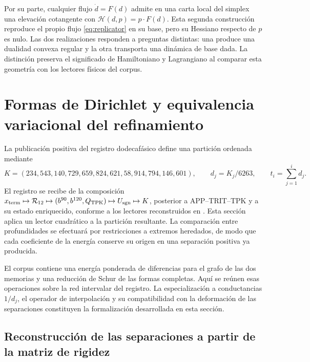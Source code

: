 \documentclass[a4paper,10pt]{article}
\theoremstyle{definition}\newtheorem{definition}[theorem]{Definición}
\theoremstyle{remark}\newtheorem{remark}[theorem]{Observación}
\numberwithin{equation}{section}
\begin{document}
Por su parte, cualquier flujo \(\dot d=F(d)\) admite en una carta local
del simplex una elevación cotangente con
\(\mathscr H(d,p)=p\cdot F(d)\). Esta segunda construcción reproduce
el propio flujo \eqref{eq:replicator} en su base, pero su Hessiano respecto
de \(p\) es nulo. Las dos realizaciones responden a preguntas distintas:
una produce una dualidad convexa regular y la otra transporta una dinámica
de base dada. La distinción preserva el significado de Hamiltoniano y
Lagrangiano al comparar esta geometría con los lectores físicos del corpus.

\section{Formas de Dirichlet y equivalencia variacional del refinamiento}
\label{sec:energia-refinamiento-k}

La publicación positiva del registro dodecafásico define una partición
ordenada mediante
\[
 K=(234,543,140,729,659,824,621,58,914,794,146,601),
 \qquad d_j=K_j/6263,
 \qquad t_i=\sum_{j=1}^id_j.
\]
El registro se recibe de la composición
\(x_{\rm term}\mapsto\mathcal R_{12}\mapsto
(b^{90},b^{120},Q_{\rm TPK})\mapsto U_{\rm sgn}\mapsto K\),
posterior a APP--TRIT--TPK y a su estado enriquecido, conforme a los lectores
reconstruidos en \cite{hmtX}. Esta sección aplica
un lector cuadrático a la partición resultante. La comparación entre
profundidades se efectuará por restricciones a extremos heredados, de modo
que cada coeficiente de la energía conserve su origen en una separación
positiva ya producida.

El corpus contiene una energía ponderada de diferencias para el grafo de
las dos memorias y una reducción de Schur de las formas completas. Aquí se
reúnen esas operaciones sobre la red intervalar del registro. La
especialización a conductancias \(1/d_j\), el operador de interpolación
y su compatibilidad con la deformación de las separaciones constituyen
la formalización desarrollada en esta sección.

\subsection{Reconstrucción de las separaciones a partir de la matriz de rigidez}
\end{document}
